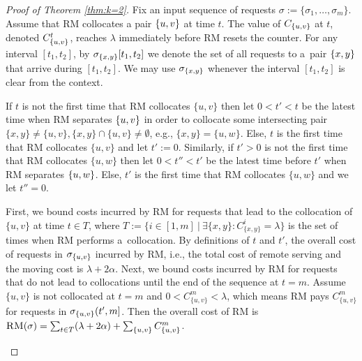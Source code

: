 \documentclass[a4paper,anonymous,USenglish]{lipics-v2019}
\newcommand{\OPT}{\textsc{OPT}\xspace}
\newcommand{\RM}{\textsc{RM}\xspace} %
\DeclarePairedDelimiter\set{\{}{\}}
\begin{document}
\begin{proof}[Proof of Theorem \ref{thm:k=2}]
	Fix an input sequence of requests
$\sigma:=\{\sigma_1,\dots, \sigma_m\}$.
	Assume that \RM collocates a pair $\set{u,v}$ at time $t$.
	The value of $C_{\set{u,v}}$ at $t$,
	denoted $C^t_{\set{u,v}}$, 
	reaches $\lambda$ immediately before \RM resets the counter.
	For any interval $[t_1,t_2]$, by $\sigma_{\set{x,y}}[t_1,t_2]$ we denote the set of all requests to a~pair $\set{x,y}$ that arrive
	during $[t_1,t_2]$.
	We may use $\sigma_{\set{x,y}}$ whenever
	 the interval $[t_1,t_2]$ is clear from the context.
	
	If $t$ is not the first time that \RM collocates $\{u,v\}$ then
	let $0 < t' < t$ be the latest time when \RM separates $\set{u,v}$
	in order to collocate some intersecting pair
	$\{x,y\} \neq \{u,v\}, \{x,y\} \cap \{u,v\} \neq \emptyset$, 
	e.g.,
	$\{x,y\}=\{u,w\}$.
	Else,
	$t$ is the first time that \RM collocates $\{u,v\}$ and let $t' := 0$.
	Similarly,
	if $t' > 0$ is not the first time that \RM  collocates $\{u,w\}$ 
	then let $0 < t'' < t'$ be the latest time before $t'$ when \RM separates $\set{u,w}$.
	Else,
	$t'$ is the first time that \RM collocates $\{u,w\}$ and we let $t''=0$.
	
	First,
	we bound  costs incurred by \RM for requests that
	lead to the collocation of $\{u,v\}$ at time $t \in T$, where
	$T := \{ i \in [1,m] ~\vert~ \exists \{x,y\}: C^{i}_{\{x,y\}} = \lambda \}$
	is the set of times when \RM performs a~collocation.
	By definitions of $t$ and $t'$,
	the overall cost of requests in $\sigma_{\set{u,v}}$ incurred by \RM,
	i.e., the total cost of remote serving 	and the moving cost is
	$\lambda + 2\alpha$.	
	Next,
	we bound costs incurred by \RM
	for requests that do not lead to collocations until the  end of the sequence at $t=m$.
	Assume $\{u,v\}$ is not collocated at $t=m$
	and $0 < C^{m}_{ \{u,v\} } < \lambda $,
	which means \RM pays $C^{m}_{ \{u,v\} }$
	for  requests in $\sigma_{\set{u,v}}(t',m]$.
    Then the overall cost of \RM is
$	\RM (\sigma)
=
\sum_{ t \in T}(\lambda + 2\alpha) +
\sum_{\{u,v\}} C^{m}_{\{u,v\}}	
$.

	
\begin{figure}[t]
	\centering
\end{figure}
\end{proof}
\end{document}
